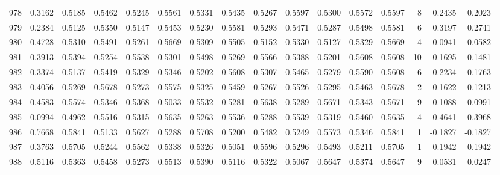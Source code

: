 \begin{tabular}{lrrrrrrrrrrrrrrr}
978 &      0.3162 &  0.5185 &  0.5462 &  0.5245 &  0.5561 &  0.5331 &  0.5435 &  0.5267 &  0.5597 &  0.5300 &   0.5572 &     0.5597 &      8 &                    0.2435 &                     0.2023 \\
979 &      0.2384 &  0.5125 &  0.5350 &  0.5147 &  0.5453 &  0.5230 &  0.5581 &  0.5293 &  0.5471 &  0.5287 &   0.5498 &     0.5581 &      6 &                    0.3197 &                     0.2741 \\
980 &      0.4728 &  0.5310 &  0.5491 &  0.5261 &  0.5669 &  0.5309 &  0.5505 &  0.5152 &  0.5330 &  0.5127 &   0.5329 &     0.5669 &      4 &                    0.0941 &                     0.0582 \\
981 &      0.3913 &  0.5394 &  0.5254 &  0.5538 &  0.5301 &  0.5498 &  0.5269 &  0.5566 &  0.5388 &  0.5201 &   0.5608 &     0.5608 &     10 &                    0.1695 &                     0.1481 \\
982 &      0.3374 &  0.5137 &  0.5419 &  0.5329 &  0.5346 &  0.5202 &  0.5608 &  0.5307 &  0.5465 &  0.5279 &   0.5590 &     0.5608 &      6 &                    0.2234 &                     0.1763 \\
983 &      0.4056 &  0.5269 &  0.5678 &  0.5273 &  0.5575 &  0.5325 &  0.5459 &  0.5267 &  0.5526 &  0.5295 &   0.5463 &     0.5678 &      2 &                    0.1622 &                     0.1213 \\
984 &      0.4583 &  0.5574 &  0.5346 &  0.5368 &  0.5033 &  0.5532 &  0.5281 &  0.5638 &  0.5289 &  0.5671 &   0.5343 &     0.5671 &      9 &                    0.1088 &                     0.0991 \\
985 &      0.0994 &  0.4962 &  0.5516 &  0.5315 &  0.5635 &  0.5263 &  0.5536 &  0.5288 &  0.5539 &  0.5319 &   0.5460 &     0.5635 &      4 &                    0.4641 &                     0.3968 \\
986 &      0.7668 &  0.5841 &  0.5133 &  0.5627 &  0.5288 &  0.5708 &  0.5200 &  0.5482 &  0.5249 &  0.5573 &   0.5346 &     0.5841 &      1 &                   -0.1827 &                    -0.1827 \\
987 &      0.3763 &  0.5705 &  0.5244 &  0.5562 &  0.5338 &  0.5326 &  0.5051 &  0.5596 &  0.5296 &  0.5493 &   0.5211 &     0.5705 &      1 &                    0.1942 &                     0.1942 \\
988 &      0.5116 &  0.5363 &  0.5458 &  0.5273 &  0.5513 &  0.5390 &  0.5116 &  0.5322 &  0.5067 &  0.5647 &   0.5374 &     0.5647 &      9 &                    0.0531 &                     0.0247 \\

\end{tabular}
